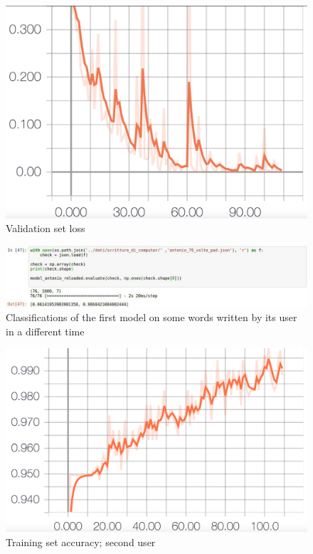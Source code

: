 \documentclass[8pt,notitlepage]{report}
\begin{document}
			\begin{figure}[H]
				\begin{center}
					\includegraphics[scale=.1865]{val_loss_Antonio}
					\caption{Validation set loss}
				\end{center}
			\end{figure}
			
			\begin{figure}
				\begin{center}
					\includegraphics[scale=.5]{test_Antonio}
					\caption{Classifications of the first model on some words written by its user in a different time}
					\label{fig:prediction}
				\end{center}
			\end{figure}
			
			\newpage
			
			\begin{figure}[H]
				\begin{center}
					\includegraphics[scale=.16]{acc_Manuel}
					\caption{Training set accuracy; second user}
					\label{fig:acc_train_Manuel}
				\end{center}
			\end{figure}
			
\end{document}
